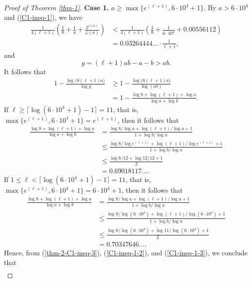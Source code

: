 \documentclass[12pt,a4paper,reqno]{amsart}
\numberwithin{equation}{section}
\theoremstyle{plain}
\theoremstyle{definition}
\begin{document}
\begin{proof}[Proof of Theorem \ref{thm-1}]
	
	\textbf{Case 1.} $a\geq \max\{e^{(\ell+1)},6 \cdot 10^{4}+1\}$.
	By $a>6 \cdot 10^{4}$ and (\ref{C1-ineq-1}), we have
	\begin{align}\label{C1-ineq-2}
		\frac{1}{4(\ell+1)} \left( \frac{1}{8}+\frac{1}{a}+\frac{2^{\omega(a)}}{\varphi(a)} \right) 
		&< \frac{1}{4(\ell+1)}\left(\frac{1}{8}+\frac{1}{6\cdot 10^{4}}+0.00556112 \right) \nonumber\\
		&= 0.03264444\ldots \cdot \frac{1}{\ell+1},
	\end{align}
	and
	\begin{equation*}
		g=(\ell+1)ab-a-b>ab.
	\end{equation*}
	It follows that
	\begin{align}\label{thm-2-C1-ineq-3}
		1-\frac{\log \big( 8(\ell+1)a \big) }{\log g}
		&\geq 1-\frac{\log \big( 8(\ell+1)a \big)}{\log (ab)}\nonumber\\
		&=1-\frac{\log 8+\log (\ell+1)+\log a}{\log a+\log b }.
	\end{align}
	If $\ell\geq \lceil \log (6\cdot 10^{4}+1)-1 \rceil=11$, that is, $\max\{e^{(\ell+1)},6\cdot 10^{4}+1\}=e^{(\ell+1)}$, then it follows that
	\begin{align}\label{C1-ineq-1-2}
		\frac{\log 8+\log (\ell+1)+\log a}{\log a+\log b}
		&=\frac{\log 8/\log a+\log(\ell+1)/\log a+1}{1+\log b/\log a}\nonumber\\
		&\leq \frac{\log 8/\log e^{(\ell+1)}+\log (\ell+1)/\log e^{(\ell+1)}+1}{1+\log b/\log a}\nonumber\\
		&\leq \frac{\log 8/12+\log 12/12+1}{2}\nonumber\\
		&= 0.69018117 \ldots .
	\end{align}
	If $1\leq \ell< \lceil \log (6\cdot 10^{4}+1)-1 \rceil=11$, that is, $\max\{e^{(\ell+1)},6\cdot 10^{4}+1\}=6\cdot 10^{4}+1$, then it follows that
	\begin{align}\label{C1-ineq-1-3}
		\frac{\log 8+\log (\ell+1)+\log a}{\log a+\log b}
		&=\frac{\log 8/\log a+\log(\ell+1)/\log a+1}{1+\log b/\log a}\nonumber\\
		&\leq \frac{\log 8/\log (6\cdot 10^{4})+\log (\ell+1)/\log (6\cdot 10^{4})+1}{1+\log b/\log a}\nonumber\\
		&\leq \frac{\log 8/\log(6\cdot 10^{4})+\log 11/\log(6\cdot 10^{4})+1}{2}\nonumber\\
		&= 0.70347646 \ldots.
	\end{align}
	Hence, from (\ref{thm-2-C1-ineq-3}), (\ref{C1-ineq-1-2}), and (\ref{C1-ineq-1-3}), we conclude that
	\begin{align*}

\end{align*}
\end{proof}
\end{document}
